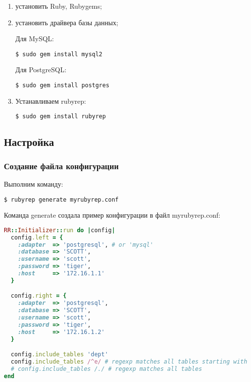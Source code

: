 \begin{enumerate}
  \item установить Ruby, Rubygems;
  \item установить драйвера базы данных;

  Для MySQL:
  \begin{lstlisting}[label=lst:rubyrep1,caption=Установка]
  $ sudo gem install mysql2
  \end{lstlisting}

  Для PostgreSQL:
  \begin{lstlisting}[label=lst:rubyrep2,caption=Установка]
  $ sudo gem install postgres
  \end{lstlisting}

  \item Устанавливаем rubyrep:
  \begin{lstlisting}[label=lst:rubyrep3,caption=Установка]
  $ sudo gem install rubyrep
  \end{lstlisting}
\end{enumerate}


\subsection{Настройка}

\subsubsection{Создание файла конфигурации}

Выполним команду:

\begin{lstlisting}[label=lst:rubyrep4,caption=Настройка]
$ rubyrep generate myrubyrep.conf
\end{lstlisting}

Команда generate создала пример конфигурации в файл myrubyrep.conf:

\begin{lstlisting}[language=Ruby,label=lst:rubyrep5,caption=Настройка]
RR::Initializer::run do |config|
  config.left = {
    :adapter  => 'postgresql', # or 'mysql'
    :database => 'SCOTT',
    :username => 'scott',
    :password => 'tiger',
    :host     => '172.16.1.1'
  }

  config.right = {
    :adapter  => 'postgresql',
    :database => 'SCOTT',
    :username => 'scott',
    :password => 'tiger',
    :host     => '172.16.1.2'
  }

  config.include_tables 'dept'
  config.include_tables /^e/ # regexp matches all tables starting with e
  # config.include_tables /./ # regexp matches all tables
end
\end{lstlisting}

